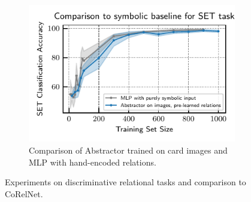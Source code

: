\begin{figure}[t]
\begin{subfigure}[t]{0.32\textwidth}
    \end{subfigure}
    \begin{subfigure}[t]{0.32\textwidth}
        \centering
        \vskip-20pt
        \includegraphics[width=\textwidth]{figures/experiments/set_symbolic_vs_abstractor.pdf}
        \vskip-5pt
        \caption{Comparison of Abstractor trained on card images and MLP with hand-encoded relations.}\label{fig:set_symbolic}%
    \end{subfigure}
    \caption{Experiments on discriminative relational tasks and comparison to CoRelNet.}
    \vskip-15pt
\end{figure}

